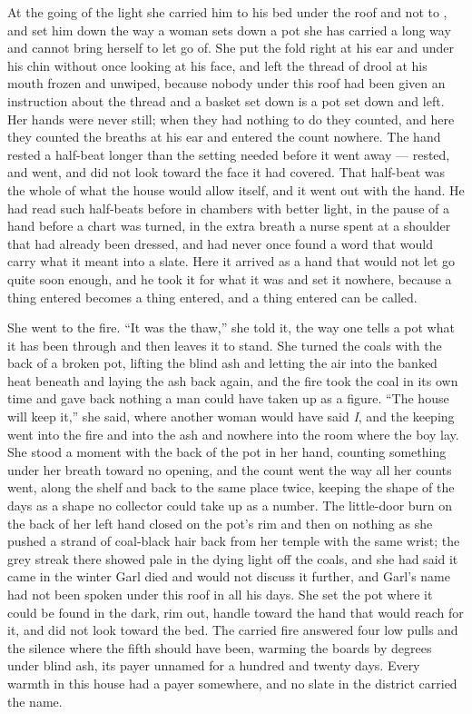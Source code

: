 \scenebreak

At the going of the light she carried him to his bed under the roof and not to , and set him down the way a woman sets down a pot she has carried a long way and cannot bring herself to let go of. She put the fold right at his ear and under his chin without once looking at his face, and left the thread of drool at his mouth frozen and unwiped, because nobody under this roof had been given an instruction about the thread and a basket set down is a pot set down and left. Her hands were never still; when they had nothing to do they counted, and here they counted the breaths at his ear and entered the count nowhere. The hand rested a half-beat longer than the setting needed before it went away --- rested, and went, and did not look toward the face it had covered. That half-beat was the whole of what the house would allow itself, and it went out with the hand. He had read such half-beats before in chambers with better light, in the pause of a hand before a chart was turned, in the extra breath a nurse spent at a shoulder that had already been dressed, and had never once found a word that would carry what it meant into a slate. Here it arrived as a hand that would not let go quite soon enough, and he took it for what it was and set it nowhere, because a thing entered becomes a thing entered, and a thing entered can be called.

She went to the fire. “It was the thaw,” she told it, the way one tells a pot what it has been through and then leaves it to stand. She turned the coals with the back of a broken pot, lifting the blind ash and letting the air into the banked heat beneath and laying the ash back again, and the fire took the coal in its own time and gave back nothing a man could have taken up as a figure. “The house will keep it,” she said, where another woman would have said \emph{I}, and the keeping went into the fire and into the ash and nowhere into the room where the boy lay. She stood a moment with the back of the pot in her hand, counting something under her breath toward no opening, and the count went the way all her counts went, along the shelf and back to the same place twice, keeping the shape of the days as a shape no collector could take up as a number. The little-door burn on the back of her left hand closed on the pot's rim and then on nothing as she pushed a strand of coal-black hair back from her temple with the same wrist; the grey streak there showed pale in the dying light off the coals, and she had said it came in the winter Garl died and would not discuss it further, and Garl's name had not been spoken under this roof in all his days. She set the pot where it could be found in the dark, rim out, handle toward the hand that would reach for it, and did not look toward the bed. The carried fire answered four low pulls and the silence where the fifth should have been, warming the boards by degrees under blind ash, its payer unnamed for a hundred and twenty days. Every warmth in this house had a payer somewhere, and no slate in the district carried the name.


